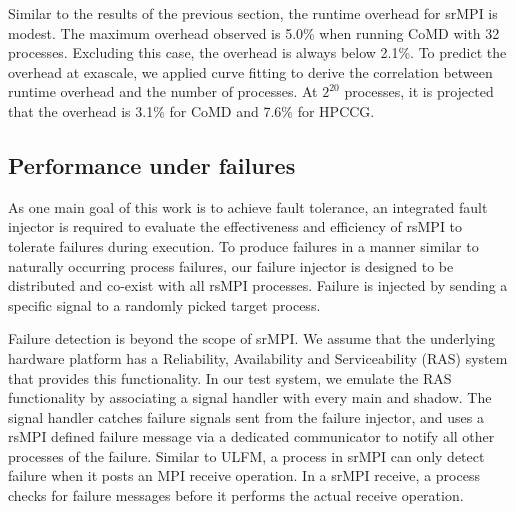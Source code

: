 Similar to the results of the previous section, the runtime overhead for srMPI is modest. The maximum overhead observed is 5.0\% when running CoMD with 32 processes. Excluding this case, the overhead is always below 2.1\%. To predict the overhead at exascale, we applied curve fitting to derive the correlation between runtime overhead and the number of processes. At $2^{20}$ processes, it is projected that the overhead is 3.1\% for CoMD and 7.6\% for HPCCG. 


\subsection{Performance under failures}

As one main goal of this work is to achieve fault tolerance, an integrated fault injector is required to evaluate the effectiveness and efficiency of rsMPI to tolerate failures during execution. To produce failures in a manner similar to naturally occurring process failures, our failure injector is designed to be distributed and co-exist with all rsMPI processes. Failure is injected by sending a specific signal to a randomly picked target process.

Failure detection is beyond the scope of srMPI. We assume that the underlying hardware platform has a Reliability, Availability and Serviceability (RAS) system that provides this functionality. In our test system, we emulate the RAS functionality by associating a signal handler with every main and shadow. The signal handler catches failure signals sent from the failure injector, and uses a rsMPI defined failure message via a dedicated communicator to notify all other processes of the failure. 
Similar to ULFM, a process in srMPI can only detect failure when it posts an MPI receive operation. In a srMPI receive, 
a process checks for failure messages before it performs the actual receive operation.

